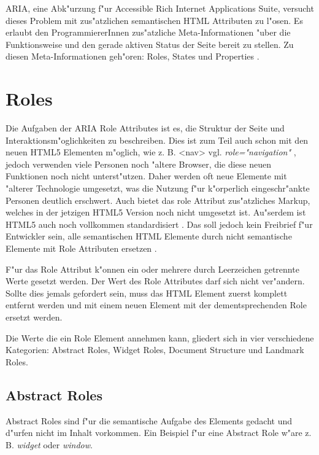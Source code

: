 \documentclass[a4paper,bibtotoc,oneside]{scrbook}
\begin{document}
ARIA, eine Abk"urzung f"ur Accessible Rich Internet Applications Suite, versucht dieses Problem mit zus"atzlichen semantischen HTML Attributen zu l"osen. Es erlaubt den ProgrammiererInnen zus"atzliche Meta-Informationen "uber die Funktionsweise und den gerade aktiven Status der Seite bereit zu stellen. Zu diesen Meta-Informationen geh"oren: Roles, States und Properties \cite{aria_intro}. 


\section{Roles}
Die Aufgaben der ARIA Role Attributes ist es, die Struktur der Seite und Interaktionsm"oglichkeiten zu beschreiben. Dies ist zum Teil auch schon mit den neuen HTML5 Elementen m"oglich, wie z. B. <nav> \cite[Abschnitt 4.4.3]{html5} vgl. \emph{role="navigation"} \cite[Abschnitt 3.1]{xhtml_vocab}, jedoch verwenden viele Personen noch "altere Browser, die diese neuen Funktionen noch nicht unterst"utzen. Daher werden oft neue Elemente mit "alterer Technologie umgesetzt, was die Nutzung f"ur k"orperlich eingeschr"ankte Personen deutlich erschwert. Auch bietet das role Attribut zus"atzliches Markup, welches in der jetzigen HTML5 Version noch nicht umgesetzt ist. Au"serdem ist HTML5 auch noch vollkommen standardisiert \cite{html5}. Das soll jedoch kein Freibrief f"ur Entwickler sein, alle semantischen HTML Elemente durch nicht semantische Elemente mit Role Attributen ersetzen \cite[Abschnitt 3]{roles}. 

F"ur das Role Attribut k"onnen ein oder mehrere durch Leerzeichen getrennte Werte gesetzt werden. Der Wert des Role Attributes darf sich nicht ver"andern. Sollte dies jemals gefordert sein, muss das HTML Element zuerst komplett entfernt werden und mit einem neuen Element mit der dementsprechenden Role ersetzt werden.\cite[Abschnitt 5]{aria_roles}

Die Werte die ein Role Element annehmen kann, gliedert sich in vier verschiedene Kategorien: Abstract Roles, Widget Roles, Document Structure und Landmark Roles. \cite[Abschnitt 5.2]{aria_states}


\subsection{Abstract Roles}
Abstract Roles sind f"ur die semantische Aufgabe des Elements gedacht und d"urfen nicht im Inhalt vorkommen. Ein Beispiel f"ur eine Abstract Role w"are z. B. \emph{widget} oder \emph{window}.\cite[Abschnitt 5.3.1]{aria_roles}
\end{document}

